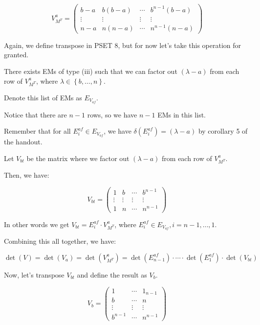 \documentclass{report}
\begin{document}
{\[
	V^{a}_{M^{T}} = \begin{pmatrix} b - a & b(b - a) & \cdots & b^{n - 1} (b - a) \\ \vdots & \vdots & \vdots & \vdots \\ n - a & n(n - a) & \cdots & n^{n - 1} (n - a) \end{pmatrix}
\]

Again, we define transpose in PSET 8, but for now let's take this operation for granted.

There exists EMs of type (iii) such that we can factor out \((\lambda - a)\) from each row of \(V^{a}_{M^{T}}\), where \(\lambda \in \left\{ b, \ldots, n \right\}\).

Denote this list of EMs as \(E_{V_{af}}\).

Notice that there are \(n - 1\) rows, so we have \(n - 1\) EMs in this list.


Remember that for all \(E^{af}_{i} \in E_{V_{af}}\), we have \(\delta(E^{af}_{i}) = (\lambda - a)\) by corollary 5 of the handout.

Let \(V_{bt}\) be the matrix where we factor out \((\lambda - a)\) from each row of \(V^{a}_{M^{T}}\).

Then, we have:

\[
	V_{bt} = \begin{pmatrix} 1 & b & \cdots & b^{n - 1} \\ \vdots & \vdots & \vdots & \vdots \\ 1 & n & \cdots & n^{n - 1} \end{pmatrix}
\]

In other words we get \(V_{bt} = E^{af}_{i} \cdot V^{a}_{M^{T}}\), where \(E^{af}_{i} \in E_{V_{af}}, i = n - 1, \ldots, 1\).

Combining this all together, we have:

\[
	\det(V) = \det(V_{a}) = \det(V^{a}_{M^{T}}) = \det(E^{af}_{n - 1}) \cdot \cdots \cdot \det(E^{af}_{1}) \cdot \det(V_{bt})
\]

Now, let's transpose \(V_{bt}\) and define the result as \(V_{b}\).

\[
	V_{b} = \begin{pmatrix} 1 & \cdots & 1_{n-1} \\ b & \cdots & n \\ \vdots & \vdots & \vdots \\ b^{n - 1} & \cdots & n^{n - 1} \end{pmatrix}
\]

}
\end{document}
